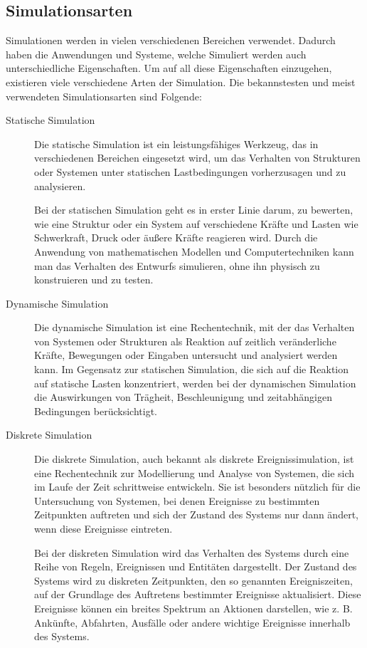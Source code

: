 \subsection{Simulationsarten}
Simulationen werden in vielen verschiedenen Bereichen verwendet. Dadurch haben die Anwendungen und Systeme, welche Simuliert werden auch unterschiedliche Eigenschaften. Um auf all diese Eigenschaften einzugehen, existieren viele verschiedene Arten der Simulation. Die bekannstesten und meist verwendeten Simulationsarten sind Folgende:

\begin{description}
    \item[Statische Simulation]
    Die statische Simulation ist ein leistungsfähiges Werkzeug, das in verschiedenen Bereichen eingesetzt wird, um das Verhalten von Strukturen oder Systemen unter statischen Lastbedingungen vorherzusagen und zu analysieren.
    
    Bei der statischen Simulation geht es in erster Linie darum, zu bewerten, wie eine Struktur oder ein System auf verschiedene Kräfte und Lasten wie Schwerkraft, Druck oder äußere Kräfte reagieren wird. Durch die Anwendung von mathematischen Modellen und Computertechniken kann man das Verhalten des Entwurfs simulieren, ohne ihn physisch zu konstruieren und zu testen.
    \cite[vgl.][]{statischeSim}

    \item[Dynamische Simulation]
    Die dynamische Simulation ist eine Rechentechnik, mit der das Verhalten von Systemen oder Strukturen als Reaktion auf zeitlich veränderliche Kräfte, Bewegungen oder Eingaben untersucht und analysiert werden kann. Im Gegensatz zur statischen Simulation, die sich auf die Reaktion auf statische Lasten konzentriert, werden bei der dynamischen Simulation die Auswirkungen von Trägheit, Beschleunigung und zeitabhängigen Bedingungen berücksichtigt.
    \cite[vgl.][]{dynamischeSim}
    
    \item[Diskrete Simulation] 
    Die diskrete Simulation, auch bekannt als diskrete Ereignissimulation, ist eine Rechentechnik zur Modellierung und Analyse von Systemen, die sich im Laufe der Zeit schrittweise entwickeln. Sie ist besonders nützlich für die Untersuchung von Systemen, bei denen Ereignisse zu bestimmten Zeitpunkten auftreten und sich der Zustand des Systems nur dann ändert, wenn diese Ereignisse eintreten.

    Bei der diskreten Simulation wird das Verhalten des Systems durch eine Reihe von Regeln, Ereignissen und Entitäten dargestellt. Der Zustand des Systems wird zu diskreten Zeitpunkten, den so genannten Ereigniszeiten, auf der Grundlage des Auftretens bestimmter Ereignisse aktualisiert. Diese Ereignisse können ein breites Spektrum an Aktionen darstellen, wie z. B. Ankünfte, Abfahrten, Ausfälle oder andere wichtige Ereignisse innerhalb des Systems.
    \cite[vgl.][]{mattern-diskrete-simulation}


\end{description}
